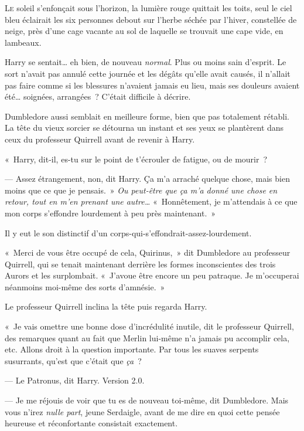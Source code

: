 
\lettrine{L}{e} soleil s'enfonçait sous l'horizon, la lumière rouge quittait les toits, seul le ciel bleu éclairait les six personnes debout sur l'herbe séchée par l'hiver, constellée de neige, près d'une cage vacante au sol de laquelle se trouvait une cape vide, en lambeaux.

Harry se sentait… eh bien, de nouveau \emph{normal}. Plus ou moins sain d'esprit. Le sort n'avait pas annulé cette journée et les dégâts qu'elle avait causés, il n'allait pas faire comme si les blessures n'avaient jamais eu lieu, mais ses douleurs avaient été… soignées, arrangées~? C'était difficile à décrire.

Dumbledore aussi semblait en meilleure forme, bien que pas totalement rétabli. La tête du vieux sorcier se détourna un instant et ses yeux se plantèrent dans ceux du professeur Quirrell avant de revenir à Harry.

«~Harry, dit-il, es-tu sur le point de t'écrouler de fatigue, ou de mourir~?

--- Assez étrangement, non, dit Harry. Ça m'a arraché quelque chose, mais bien moins que ce que je pensais.~» \emph{Ou peut-être que ça m'a donné une chose en retour, tout en m'en prenant une autre…} «~Honnêtement, je m'attendais à ce que mon corps s'effondre lourdement à peu près maintenant.~»

Il y eut le son distinctif d'un corps-qui-s'effondrait-assez-lourdement.

«~Merci de vous être occupé de cela, Quirinus,~» dit Dumbledore au professeur Quirrell, qui se tenait maintenant derrière les formes inconscientes des trois Aurors et les surplombait. «~J'avoue être encore un peu patraque. Je m'occuperai néanmoins moi-même des sorts d'amnésie.~»

Le professeur Quirrell inclina la tête puis regarda Harry.

«~Je vais omettre une bonne dose d'incrédulité inutile, dit le professeur Quirrell, des remarques quant au fait que Merlin lui-même n'a jamais pu accomplir cela, etc. Allons droit à la question importante. Par tous les suaves serpents susurrants, qu'est que c'était que \emph{ça}~?

--- Le Patronus, dit Harry. Version 2.0.

--- Je me réjouis de voir que tu es de nouveau toi-même, dit Dumbledore. Mais vous n'irez \emph{nulle part}, jeune Serdaigle, avant de me dire en quoi cette pensée heureuse et réconfortante consistait exactement.

